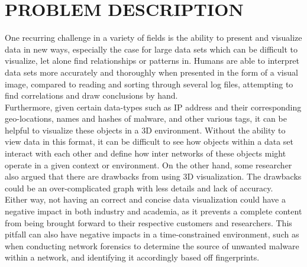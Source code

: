 \documentclass[journal,10pt,onecolumn,compsoc]{IEEEtran} \usepackage[margin=1.0in]{geometry} \usepackage{pdfpages}
\begin{document}
\section{PROBLEM DESCRIPTION}
    One recurring challenge in a variety of fields is the ability to present and visualize data in new ways, especially the case for large data sets which can be difficult to visualize, let alone find relationships or patterns in. Humans are able to interpret data sets more accurately and thoroughly when presented in the form of a visual image, compared to reading and sorting through several log files, attempting to find correlations and draw conclusions by hand.\\
    \newline
    Furthermore, given certain data-types such as IP address and their corresponding geo-locations, names and hashes of malware, and other various tags, it can be helpful to visualize these objects in a 3D environment. Without the ability to view data in this format, it can be difficult to see how objects within a data set interact with each other and define how inter networks of these objects might operate in a given context or environment. On the other hand, some researcher also argued that there are drawbacks from using 3D visualization. The drawbacks could be an over-complicated graph with less details and lack of accuracy.\\
    \newline
    Either way, not having an correct and concise data visualization could have a negative impact in both industry and academia, as it prevents a complete content from being brought forward to their respective customers and researchers. This pitfall can also have negative impacts in a time-constrained environment, such as when conducting network forensics to determine the source of unwanted malware within a network, and identifying it accordingly based off fingerprints.
\end{document}
